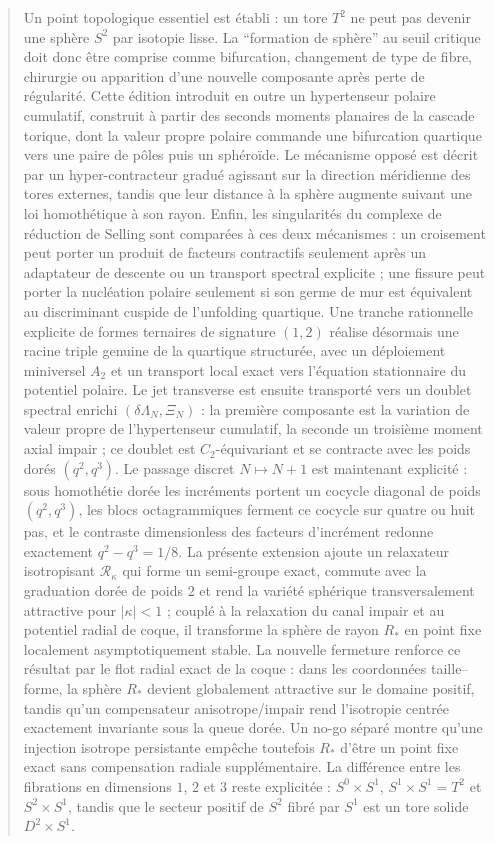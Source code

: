 \documentclass[11pt,a4paper]{article}
\begin{document}
\begin{abstract}
Un point topologique essentiel est établi : un tore $T^2$ ne peut pas devenir une sphère $S^2$ par isotopie lisse. La ``formation de sphère'' au seuil critique doit donc être comprise comme bifurcation, changement de type de fibre, chirurgie ou apparition d'une nouvelle composante après perte de régularité. Cette édition introduit en outre un hypertenseur polaire cumulatif, construit à partir des seconds moments planaires de la cascade torique, dont la valeur propre polaire commande une bifurcation quartique vers une paire de pôles puis un sphéroïde. Le mécanisme opposé est décrit par un hyper-contracteur gradué agissant sur la direction méridienne des tores externes, tandis que leur distance à la sphère augmente suivant une loi homothétique à son rayon. Enfin, les singularités du complexe de réduction de Selling sont comparées à ces deux mécanismes : un croisement peut porter un produit de facteurs contractifs seulement après un adaptateur de descente ou un transport spectral explicite ; une fissure peut porter la nucléation polaire seulement si son germe de mur est équivalent au discriminant cuspide de l'unfolding quartique. Une tranche rationnelle explicite de formes ternaires de signature $(1,2)$ réalise désormais une racine triple genuine de la quartique structurée, avec un déploiement miniversel $A_2$ et un transport local exact vers l'équation stationnaire du potentiel polaire. Le jet transverse est ensuite transporté vers un doublet spectral enrichi $(\delta\Lambda_N,\Xi_N)$ : la première composante est la variation de valeur propre de l'hypertenseur cumulatif, la seconde un troisième moment axial impair ; ce doublet est $C_2$-équivariant et se contracte avec les poids dorés $(q^2,q^3)$. Le passage discret $N\mapsto N+1$ est maintenant explicité : sous homothétie dorée les incréments portent un cocycle diagonal de poids $(q^2,q^3)$, les blocs octagrammiques ferment ce cocycle sur quatre ou huit pas, et le contraste dimensionless des facteurs d'incrément redonne exactement $q^2-q^3=1/8$. La présente extension ajoute un relaxateur isotropisant $\mathcal R_\kappa$ qui forme un semi-groupe exact, commute avec la graduation dorée de poids $2$ et rend la variété sphérique transversalement attractive pour $|\kappa|<1$ ; couplé à la relaxation du canal impair et au potentiel radial de coque, il transforme la sphère de rayon $R_*$ en point fixe localement asymptotiquement stable. La nouvelle fermeture renforce ce résultat par le flot radial exact de la coque : dans les coordonnées taille--forme, la sphère $R_*$ devient globalement attractive sur le domaine positif, tandis qu'un compensateur anisotrope/impair rend l'isotropie centrée exactement invariante sous la queue dorée. Un no-go séparé montre qu'une injection isotrope persistante empêche toutefois $R_*$ d'être un point fixe exact sans compensation radiale supplémentaire. La différence entre les fibrations en dimensions $1$, $2$ et $3$ reste explicitée : $S^0\times S^1$, $S^1\times S^1=T^2$ et $S^2\times S^1$, tandis que le secteur positif de $S^2$ fibré par $S^1$ est un tore solide $D^2\times S^1$.



\end{abstract}
\end{document}

